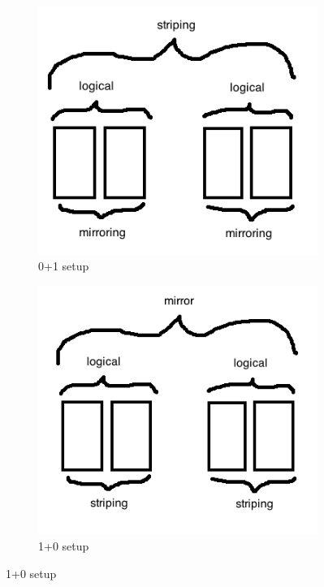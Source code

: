 \begin{figure}[h!]
\centering
        \begin{subfigure}[b]{0.3\textwidth}
                \includegraphics[width=\textwidth]{0_plus_1.png}
                \caption{0+1 setup}
        \end{subfigure}
        \begin{subfigure}[b]{0.3\textwidth}
                \includegraphics[width=\textwidth]{1_plus_0.png}
                \caption{1+0 setup}
        \end{subfigure}
\end{figure}

